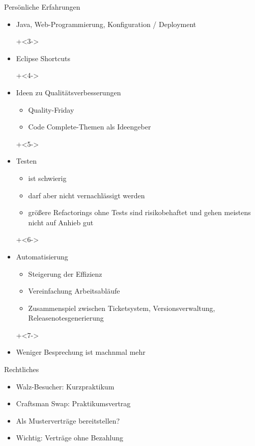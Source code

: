 \begin{frame}{Persönliche Erfahrungen}

\begin{itemize}
\onslide+<2->
\item Java, Web-Programmierung, Konfiguration / Deployment

\onslide+<3->
\item Eclipse Shortcuts

\onslide+<4->
\item Ideen zu Qualitätsverbesserungen
\begin{itemize}
\item Quality-Friday
\item \glqq Code Complete\grqq{}-Themen als Ideengeber
\end{itemize}

\onslide+<5->
\item Testen
\begin{itemize}
\item  ist schwierig
\item darf aber nicht vernachlässigt werden
\item größere Refactorings ohne Tests sind risikobehaftet und gehen meistens nicht auf Anhieb gut
\end{itemize}

\onslide+<6->
\item Automatisierung
\begin{itemize}
\item Steigerung der Effizienz
\item Vereinfachung Arbeitsabläufe
\item Zusammenspiel zwischen Ticketsystem, Versionsverwaltung, Releasenotesgenerierung
\end{itemize}

\onslide+<7->
\item Weniger Besprechung ist machnmal mehr


\end{itemize}

\end{frame}


\begin{frame}{Rechtliches}

\begin{itemize}
\item Walz-Besucher: Kurzpraktikum

\item Craftsman Swap: Praktikumsvertrag

\item Als Musterverträge bereitstellen?

\item Wichtig: Verträge ohne Bezahlung

\end{itemize}

\end{frame}


